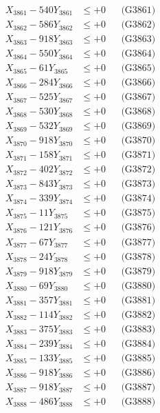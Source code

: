 \documentclass[a4paper,10pt]{article}
\begin{document}
{\begin{align}
\allowbreak
X_{3861} - 540Y_{3861} &\leq +0 && \text{(G3861)} \\
X_{3862} - 586Y_{3862} &\leq +0 && \text{(G3862)} \\
X_{3863} - 918Y_{3863} &\leq +0 && \text{(G3863)} \\
X_{3864} - 550Y_{3864} &\leq +0 && \text{(G3864)} \\
X_{3865} - 61Y_{3865} &\leq +0 && \text{(G3865)} \\
X_{3866} - 284Y_{3866} &\leq +0 && \text{(G3866)} \\
X_{3867} - 525Y_{3867} &\leq +0 && \text{(G3867)} \\
X_{3868} - 530Y_{3868} &\leq +0 && \text{(G3868)} \\
X_{3869} - 532Y_{3869} &\leq +0 && \text{(G3869)} \\
X_{3870} - 918Y_{3870} &\leq +0 && \text{(G3870)} \\
\allowbreak
X_{3871} - 158Y_{3871} &\leq +0 && \text{(G3871)} \\
X_{3872} - 402Y_{3872} &\leq +0 && \text{(G3872)} \\
X_{3873} - 843Y_{3873} &\leq +0 && \text{(G3873)} \\
X_{3874} - 339Y_{3874} &\leq +0 && \text{(G3874)} \\
X_{3875} - 11Y_{3875} &\leq +0 && \text{(G3875)} \\
X_{3876} - 121Y_{3876} &\leq +0 && \text{(G3876)} \\
X_{3877} - 67Y_{3877} &\leq +0 && \text{(G3877)} \\
X_{3878} - 24Y_{3878} &\leq +0 && \text{(G3878)} \\
X_{3879} - 918Y_{3879} &\leq +0 && \text{(G3879)} \\
X_{3880} - 69Y_{3880} &\leq +0 && \text{(G3880)} \\
\allowbreak
X_{3881} - 357Y_{3881} &\leq +0 && \text{(G3881)} \\
X_{3882} - 114Y_{3882} &\leq +0 && \text{(G3882)} \\
X_{3883} - 375Y_{3883} &\leq +0 && \text{(G3883)} \\
X_{3884} - 239Y_{3884} &\leq +0 && \text{(G3884)} \\
X_{3885} - 133Y_{3885} &\leq +0 && \text{(G3885)} \\
X_{3886} - 918Y_{3886} &\leq +0 && \text{(G3886)} \\
X_{3887} - 918Y_{3887} &\leq +0 && \text{(G3887)} \\
X_{3888} - 486Y_{3888} &\leq +0 && \text{(G3888)} \\

\end{align}}
\end{document}
